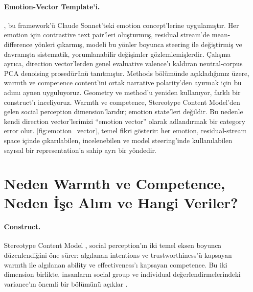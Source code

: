 \documentclass[twocolumn]{article}
\begin{document}
\paragraph{Emotion-Vector Template'i.}
\citet{sofroniew2026emotion}, bu framework'ü Claude Sonnet'teki emotion
concept'lerine uygulamıştır. Her emotion için contrastive text pair'leri
oluşturmuş, residual stream'de mean-difference yönleri çıkarmış, modeli bu
yönler boyunca steering ile değiştirmiş ve davranışta sistematik, yorumlanabilir
değişimler gözlemlemişlerdir. Çalışma ayrıca, direction vector'lerden genel
evaluative valence'ı kaldıran neutral-corpus PCA denoising prosedürünü
tanıtmıştır. Methods bölümünde açıkladığımız üzere, warmth ve competence
content'ini ortak narrative polarity'den ayırmak için bu adımı aynen
uyguluyoruz. Geometry ve method'u yeniden kullanıyor, farklı bir construct'ı
inceliyoruz. Warmth ve competence, Stereotype Content Model'den gelen social
perception dimension'larıdır; emotion state'leri değildir. Bu nedenle kendi
direction vector'lerimizi ``emotion vector'' olarak adlandırmak bir category
error olur. \autoref{fig:emotion_vector}, temel fikri gösterir: her emotion,
residual-stream space içinde çıkarılabilen, incelenebilen ve model steering'inde
kullanılabilen sayısal bir representation'a sahip ayrı bir yöndedir.

\section*{Neden Warmth ve Competence, Neden İşe Alım ve Hangi Veriler?}

\paragraph{Construct.}
Stereotype Content Model \citep{fiske2002model}, social perception'ın iki temel
eksen boyunca düzenlendiğini öne sürer: algılanan intentions ve
trustworthiness'ü kapsayan warmth ile algılanan ability ve effectiveness'ı
kapsayan competence. Bu iki dimension birlikte, insanların social group ve
individual değerlendirmelerindeki variance'ın önemli bir bölümünü açıklar
\citep{fiske2007universal}.
\end{document}

